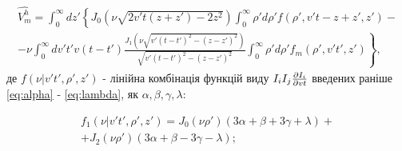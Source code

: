 

\begin{equation} \begin{aligned} \label{eq:vmh_final}
\hat{V_m^h} = \int_{0}^{\infty} dz'
\left\{ J_0 \left( \nu \sqrt{2 v't (z + z') - 2 z^2} \right) 
\int_{0}^{\infty} \rho' d \rho'
f (\rho',v't - z + z',z') - \right. \\ 
\left. - \nu \int_{0}^{\infty} dv't' v (t-t') 
\frac{J_1 \left( \nu \sqrt{v'(t-t')^2 - (z-z')^2} \right)}
{\sqrt{v'(t-t')^2 - (z-z')^2}} 
\int_{0}^{\infty} \rho' d\rho'
f_m (\rho',v't',z')  \right\},
\end{aligned} \end{equation}
%
де $ f ( \nu | v't', \rho', z') $ - лінійна комбінація функцій виду
$ I_i I_j \frac{\partial I_i}{\partial vt} $ введених раніше \eqref{eq:alpha} - 
\eqref{eq:lambda}, як $ \alpha, \beta, \gamma, \lambda $:

\begin{equation} \begin{gathered}
f_1 ( \nu | v't', \rho', z') = 
J_0 (\nu \rho') (3 \alpha + \beta + 3 \gamma + \lambda) + \\
+ J_2 (\nu \rho') (3 \alpha + \beta - 3 \gamma - \lambda);
\end{gathered} \end{equation}

